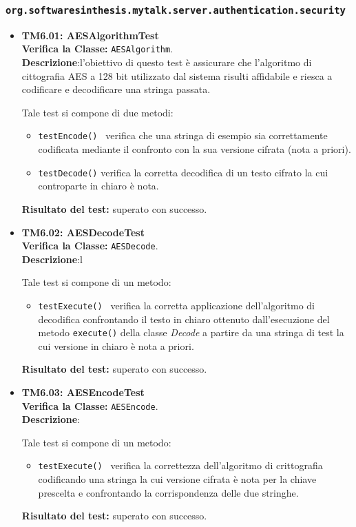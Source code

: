 \subsubsection{\texttt{org.softwaresinthesis.mytalk.server.authentication.security}}
\begin{itemize}

\item \textbf{TM6.01: AESAlgorithmTest}\\
\textbf{Verifica la Classe:} \texttt{AESAlgorithm}.\\
\textbf{Descrizione}:l'obiettivo di questo test è assicurare che l'algoritmo di cittografia AES a 128 bit utilizzato dal sistema \caName{} risulti affidabile e riesca a codificare e decodificare una stringa passata.

Tale test si compone di due metodi:
\begin{itemize}
\item \texttt{testEncode() } verifica che una stringa di esempio sia correttamente codificata mediante il confronto con la sua versione cifrata (nota a priori).

\item \texttt{testDecode()} verifica la corretta decodifica di un testo cifrato la cui controparte in chiaro è nota.
\end{itemize}
\textbf{Risultato del test:} superato con successo.


\item \textbf{TM6.02: AESDecodeTest}\\
\textbf{Verifica la Classe:} \texttt{AESDecode}.\\
\textbf{Descrizione}:l %

Tale test si compone di un metodo:
\begin{itemize}
\item \texttt{testExecute() } verifica la corretta applicazione dell'algoritmo di decodifica confrontando il testo in chiaro ottenuto dall'esecuzione del metodo \texttt{execute()} della classe \textit{Decode} a partire da una stringa di test la cui versione in chiaro è nota a priori.
\end{itemize}
\textbf{Risultato del test:} superato con successo.


\item \textbf{TM6.03: AESEncodeTest}\\
\textbf{Verifica la Classe:} \texttt{AESEncode}.\\
\textbf{Descrizione}: %

Tale test si compone di un metodo:
\begin{itemize}
\item \texttt{testExecute() } verifica la correttezza dell'algoritmo di crittografia codificando una stringa la cui versione cifrata è nota per la chiave prescelta e confrontando la corrispondenza delle due stringhe.
\end{itemize}
\textbf{Risultato del test:} superato con successo.


\end{itemize}


